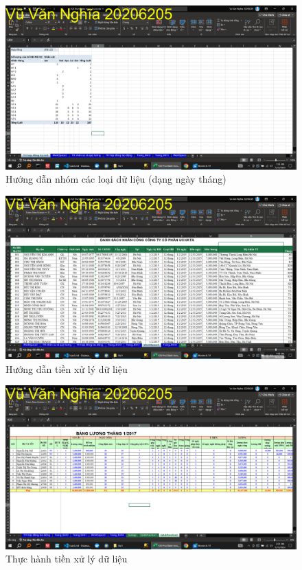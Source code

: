 \documentclass{article}
\begin{document}
\begin{figure}[H]
    \centering
    \includegraphics[scale = 0.15]{Bai1/HuongDan/8.png}
    \caption{Hướng dẫn nhóm các loại dữ liệu (dạng ngày tháng)}
\end{figure}






\begin{figure}[H]
    \centering
    \includegraphics[scale = 0.15]{Bai1/HuongDan/9.png}
    \caption{Hướng dẫn tiền xử lý dữ liệu}
\end{figure}






\begin{figure}[H]
    \centering
    \includegraphics[scale = 0.15]{Bai1/ThucHanh/0.png}
    \caption{Thực hành tiền xử lý dữ liệu}
\end{figure}
\end{document}
